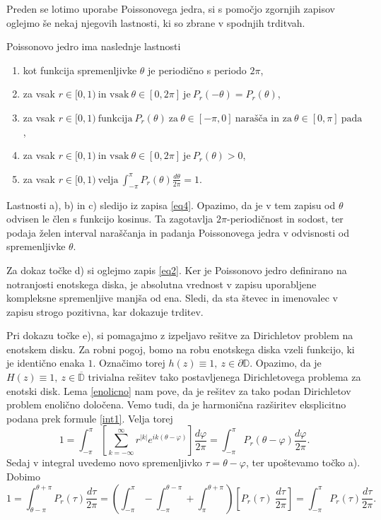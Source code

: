 \documentclass[mat1, tisk]{fmfdelo}
\begin{document}
    Preden se lotimo uporabe Poissonovega jedra, si s pomočjo zgornjih zapisov oglejmo še nekaj njegovih lastnosti, ki so zbrane v spodnjih trditvah. 
    
    \begin{trditev}
        \label{lastpk}
        Poissonovo jedro ima naslednje lastnosti
        \begin{enumerate}[label={\alph*)}]
            \item kot funkcija spremenljivke $\theta$ je periodično s periodo $2\pi$, 
            \item za vsak $r \in [0,1)~\text{in vsak}~\theta \in [0,2\pi]~\text{je}~P_r(-\theta) = P_r(\theta)$,
            \item za vsak $r \in [0,1)~\text{funkcija}~P_r(\theta)~\text{za}~\theta \in [-\pi, 0 ]~\text{narašča in za}~\theta \in [0, \pi ]~\text{pada}$,
            \item za vsak $r \in [0,1)~\text{in vsak}~\theta\in [0,2\pi]~\text{je}~P_r(\theta) > 0$,
            \item za vsak $r \in [0,1)~\text{velja}~\int_{-\pi}^{\pi}{P_r(\theta) \frac{d\theta}{2\pi}} = 1$.
        \end{enumerate}
    \end{trditev}
    \begin{dokaz}
        Lastnosti a), b) in c) sledijo iz zapisa \eqref{eq4}. Opazimo, da je v tem zapisu od $\theta$ odvisen le člen s funkcijo kosinus. 
        Ta zagotavlja $2\pi$-periodičnost in sodost, ter podaja želen interval naraščanja in padanja Poissonovega jedra v odvisnosti od spremenljivke $\theta$. 
        
        Za dokaz točke d) si oglejmo zapis \eqref{eq2}. Ker je Poissonovo jedro definirano na notranjosti enotskega diska, je absolutna vrednost v zapisu uporabljene kompleksne spremenljive manjša od ena. 
        Sledi, da sta števec in imenovalec v zapisu strogo pozitivna, kar dokazuje trditev. 

        Pri dokazu točke e), si pomagajmo z izpeljavo rešitve za Dirichletov problem na enotskem disku. 
        Za robni pogoj, bomo na robu enotskega diska vzeli funkcijo, ki je identično enaka $1$. Označimo torej $h(z) \equiv 1,~ z \in \partial \mathbb{D}$. Opazimo, da je \mbox{$H(z) \equiv 1,~z \in \overline{\mathbb{D}}$} trivialna rešitev tako postavljenega Dirichletovega problema za enotski disk.
        Lema \ref{enolicno} nam pove, da je rešitev za tako podan Dirichletov problem enolično določena. Vemo tudi, da je harmonična razširitev eksplicitno podana prek formule \eqref{int1}.
        Velja torej
        $$
        1 = \int_{-\pi}^{\pi}{\left[\sum_{k=-\infty}^{\infty}{r^{|k|} e^{ik(\theta - \varphi)}}\right] \frac{d \varphi}{2 \pi}} = \int_{-\pi}^{\pi}{P_r(\theta - \varphi)\frac{d \varphi}{2 \pi}}. 
        $$
        Sedaj v integral uvedemo novo spremenljivko $\tau = \theta - \varphi$, ter upoštevamo točko a). Dobimo 
        $$
        1 = \int_{\theta - \pi}^{\theta + \pi}{P_r(\tau)\frac{d \tau}{2 \pi}} = \left(\int_{-\pi}^{\pi} - \int_{-\pi}^{\theta -\pi} + \int_{\pi}^{\theta + \pi}\right)\left[ P_r(\tau)~\frac{d\tau}{2 \pi}\right] = \int_{-\pi}^{\pi}{P_r(\tau)\frac{d \tau}{2 \pi}}.
        $$
    \end{dokaz}
\end{document}
